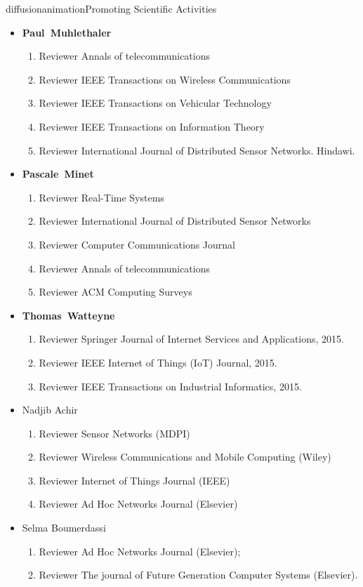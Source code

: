 \documentclass{ra2016}
\newcommand{\paul}  {\textbf{Paul~Muhlethaler}}
\newcommand{\pascale} {\textbf{Pascale~Minet}}
\newcommand{\thomas}  {\textbf{Thomas~Watteyne}}
\begin{document}
\begin{module}{diffusion}{animation}{Promoting Scientific Activities}
       \begin{itemize}
    \item \paul
        \begin{enumerate}
            \item Reviewer Annals of telecommunications
            \item Reviewer IEEE Transactions on Wireless Communications
            \item Reviewer IEEE Transactions on Vehicular Technology
            \item Reviewer IEEE Transactions on Information Theory
            \item Reviewer International Journal of Distributed Sensor Networks. Hindawi. 
        \end{enumerate}
    \item \pascale
        \begin{enumerate}
            \item Reviewer Real-Time Systems
            \item Reviewer International Journal of Distributed Sensor Networks
            \item Reviewer Computer Communications Journal
            \item Reviewer Annals of telecommunications
            \item Reviewer ACM Computing Surveys
        \end{enumerate}
    \item \thomas
        \begin{enumerate}
            \item Reviewer Springer Journal of Internet Services and Applications, 2015.
            \item Reviewer IEEE Internet of Things (IoT) Journal, 2015.
            \item Reviewer IEEE Transactions on Industrial Informatics, 2015.
        \end{enumerate}
    \item Nadjib Achir
        \begin{enumerate}
            \item Reviewer Sensor Networks (MDPI)
            \item Reviewer Wireless Communications and Mobile Computing (Wiley)
            \item Reviewer Internet of Things Journal (IEEE)
            \item Reviewer Ad Hoc Networks Journal (Elsevier)
        \end{enumerate}
     \item Selma Boumerdassi
				\begin{enumerate}
					\item Reviewer Ad Hoc Networks Journal (Elsevier);
					\item Reviewer The journal of Future Generation Computer Systems (Elsevier).
				\end{enumerate}


\end{itemize}
\end{module}
\end{document}
